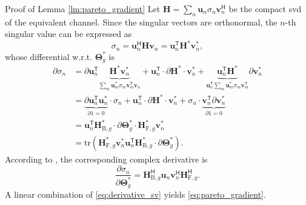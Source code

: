 \documentclass[journal]{IEEEtran}
\begin{document}
\begin{appendix}
	\begin{subsection}{Proof of Lemma \ref{lm:pareto_gradient}}\label{ap:pareto_gradient}
		Let $\mathbf{H} = \sum_n \mathbf{u}_n \sigma_n \mathbf{v}_n^\mathsf{H}$ be the compact \gls{svd} of the equivalent channel.
		Since the singular vectors are orthonormal, the $n$-th singular value can be expressed as
		\begin{equation}
			\sigma_n = \mathbf{u}_n^\mathsf{H} \mathbf{H} \mathbf{v}_n = \mathbf{u}_n^\mathsf{T} \mathbf{H}^* \mathbf{v}_n^*,
		\end{equation}
		whose differential w.r.t. $\mathbf{\Theta}_g^*$ is
		\begin{align*}
			\partial \sigma_n
			& = \partial \mathbf{u}_n^\mathsf{T} \underbrace{\mathbf{H}^* \mathbf{v}_n^*}_{\sum_m \mathbf{u}_m^* \sigma_m \mathbf{v}_m^\mathsf{T} \mathbf{v}_n} + \mathbf{u}_n^\mathsf{T} \cdot \partial \mathbf{H}^* \cdot \mathbf{v}_n^* + \underbrace{\mathbf{u}_n^\mathsf{T} \mathbf{H}^*}_{\mathbf{u}_n^\mathsf{T} \sum_m \mathbf{u}_m^* \sigma_m \mathbf{v}_m^\mathsf{T}} \partial \mathbf{v}_n^*\\
			& = \underbrace{\partial \mathbf{u}_n^\mathsf{T} \mathbf{u}_n^*}_{\partial 1 = 0} \cdot \sigma_n + \mathbf{u}_n^\mathsf{T} \cdot \partial \mathbf{H}^* \cdot \mathbf{v}_n^* + \sigma_n \cdot \underbrace{\mathbf{v}_n^\mathsf{T} \partial \mathbf{v}_n^*}_{\partial 1 = 0}\\
			& = \mathbf{u}_n^\mathsf{T} \mathbf{H}_{\mathrm{B},g}^* \cdot \partial \mathbf{\Theta}_g^* \cdot \mathbf{H}_{\mathrm{F},g}^* \mathbf{v}_n^*\\
			& = \mathrm{tr}(\mathbf{H}_{\mathrm{F},g}^* \mathbf{v}_n^*\mathbf{u}_n^\mathsf{T} \mathbf{H}_{\mathrm{B},g}^* \cdot \partial \mathbf{\Theta}_g^*).
		\end{align*}
		According to \cite{Hjorungnes2007}, the corresponding complex derivative is
		\begin{equation}
			\frac{\partial \sigma_n}{\partial \mathbf{\Theta}_g^*} = \mathbf{H}_{\mathrm{B},g}^\mathsf{H} \mathbf{u}_n \mathbf{v}_n^\mathsf{H} \mathbf{H}_{\mathrm{F},g}^\mathsf{H}.
			\label{eq:derivative_sv}
		\end{equation}
		A linear combination of \eqref{eq:derivative_sv} yields \eqref{eq:pareto_gradient}.
	\end{subsection}


\end{appendix}
\end{document}

